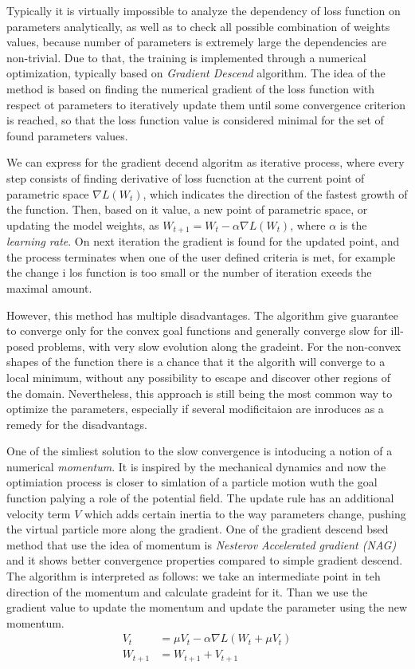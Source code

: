 Typically it is virtually impossible to analyze the dependency of loss function on parameters analytically, as well as to check all possible combination of weights values, because number of parameters is extremely large the dependencies are non-trivial. 
Due to that, the training is implemented through a numerical optimization, typically based on \textit{Gradient Descend} algorithm. 
The idea of the method is based on finding the numerical gradient of the loss function with respect ot parameters to iteratively update them until some convergence criterion is reached, so that the loss function value is considered minimal for the set of found parameters values.

We can express for the gradient decend algoritm as iterative process, where every step consists of finding derivative of loss fucnction at the current point of parametric space $\nabla L(W_{t})$, which indicates the direction of the fastest growth of the function. 
Then, based on it value, a new point of parametric space, or updating the model weights, as $W_{t+1}=W_{t}-\alpha \nabla L(W_{t})$, where $\alpha$ is the \textit{learning rate}.
On next iteration the gradient is found for the updated point, and the process terminates when one of the user defined criteria is met, for example the change i los function is too small or the number of iteration exeeds the maximal amount.

However, this method has multiple disadvantages.
The algorithm give guarantee to converge only for the convex goal functions and generally converge slow for ill-posed problems, with very slow evolution along the gradeint.
For the non-convex shapes of the function there is a chance that it the algorith will converge to a local minimum, without any possibility to escape and discover other regions of the domain.
Nevertheless, this approach is still being the most common way to optimize the parameters, especially if several modificitaion are inroduces as a remedy for the disadvantags.

One of the simliest solution to the slow convergence is intoducing a notion of a numerical \textit{momentum}.
It is inspired by the mechanical dynamics and now the optimiation process is closer to simlation of a particle motion wuth the goal function palying a role of the potential field.
The update rule has an additional velocity term $V$ which adds certain inertia to the way parameters change, pushing the virtual particle more along the gradient. 
One of the gradient descend bsed method that use the idea of momentum is \textit{Nesterov Accelerated gradient (NAG)} and it shows better convergence properties compared to simple gradient descend.
The algorithm is interpreted as follows: 
we take an intermediate point in teh direction of the momentum and calculate gradeint for it.
Than we use the gradient value to update the momentum and update the parameter using the new momentum.
\begin{align*}
	V_{t} & =\mu V_{t} - \alpha \nabla L (W_{t}+\mu V_{t}) \\
	W_{t+1} & = W_{t+1} + V_{t+1}
\end{align*}





